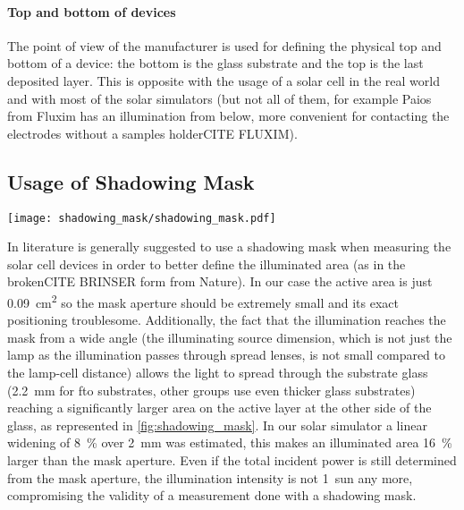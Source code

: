 \paragraph{Top and bottom of devices} The point of view of the manufacturer is used for defining the physical top and bottom of a device: the bottom is the glass substrate and the top is the last deposited layer. This is opposite with the usage of a solar cell in the real world and with most of the solar simulators (but not all of them, for example Paios from Fluxim has an illumination from below, more convenient for contacting the electrodes without a samples holderCITE FLUXIM).

\subsection{Usage of Shadowing Mask}

\begin{SCfigure}
	\centering
	\texttt{[image: shadowing\_mask/shadowing\_mask.pdf]}
	\label{fig:shadowing_mask}
\end{SCfigure}

In literature is generally suggested to use a shadowing mask when measuring the solar cell devices in order to better define the illuminated area (as in the brokenCITE BRINSER form from Nature\cite{NatureResearch2017}). %
In our case the active area is just \SI{0.09}{\square\cm} so the mask aperture should be extremely small and its exact positioning troublesome. Additionally, the fact that the illumination reaches the mask from a wide angle (the illuminating source dimension, which is not just the lamp as the illumination passes through spread lenses, is not small compared to the lamp-cell distance) allows the light to spread through the substrate glass (\SI{2.2}{\mm} for \gls{fto} substrates, other groups use even thicker glass substrates) reaching a significantly larger area on the active layer at the other side of the glass, as represented in \cref{fig:shadowing_mask}. In our solar simulator a linear widening of 8~\% over \SI{2}{\mm} was estimated, this makes an illuminated area 16~\% larger than the mask aperture. Even if the total incident power is still determined from the mask aperture, the illumination intensity is not 1~sun any more, compromising the validity of a measurement done with a shadowing mask.


